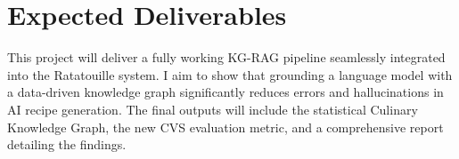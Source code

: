 \documentclass[12pt,a4paper]{article}
\begin{document}
\section*{Expected Deliverables}
This project will deliver a fully working KG-RAG pipeline seamlessly integrated into the Ratatouille system. I aim to show that grounding a language model with a data-driven knowledge graph significantly reduces errors and hallucinations in AI recipe generation. The final outputs will include the statistical Culinary Knowledge Graph, the new CVS evaluation metric, and a comprehensive report detailing the findings.
\end{document}
